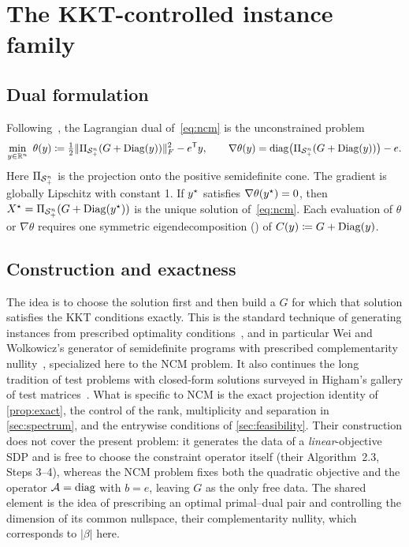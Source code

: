 \section{The KKT-controlled instance family}\label{sec:family}

\subsection{Dual formulation}
Following~\cite{malick2004dual,qisun2006quadratically}, the Lagrangian dual of~\eqref{eq:ncm}
is the unconstrained problem
\begin{equation}\label{eq:dual}
  \min_{y\in\mathbb{R}^n}\ \theta(y) \coloneqq \tfrac12\lVert \Pi_{\mathcal{S}_+^n}(G+\operatorname{Diag}(y))\rVert_F^2 - e^{\mathsf T}y ,
  \qquad
  \nabla\theta(y) = \operatorname{diag}\bigl(\Pi_{\mathcal{S}_+^n}(G+\operatorname{Diag}(y))\bigr) - e .
\end{equation}
Here $\Pi_{\mathcal{S}_+^n}$ is the projection onto the positive semidefinite cone. The
gradient is globally Lipschitz with constant 1. If $y^\star$ satisfies
$\nabla\theta(y^\star)=0$, then $X^\star=\Pi_{\mathcal{S}_+^n}(G+\operatorname{Diag}(y^\star))$ is the unique solution
of~\eqref{eq:ncm}. Each evaluation of $\theta$ or $\nabla\theta$ requires one
symmetric eigendecomposition (\EVD) of $C(y)\coloneqq G+\operatorname{Diag}(y)$.

\subsection{Construction and exactness}\label{sec:construction}
The idea is to choose the solution first and then build a $G$ for which that
solution satisfies the KKT conditions exactly. This is the standard technique
of generating instances from prescribed optimality
conditions~\cite{lenard1984randomly,calamai1993new}, and in particular Wei and
Wolkowicz's generator of semidefinite programs with prescribed complementarity
nullity~\cite{wei2010generating}, specialized here to the NCM problem. It also
continues the long tradition of test problems with closed-form solutions
surveyed in Higham's gallery of test matrices~\cite[Ch.~28]{higham2002accuracy}. What is
specific to NCM is the exact projection identity of \cref{prop:exact}, the
control of the rank, multiplicity and separation in \cref{sec:spectrum}, and
the entrywise conditions of \cref{sec:feasibility}.
Their construction does not cover the present problem: it generates the data
of a \emph{linear}-objective SDP and is free to choose the constraint operator
itself (their Algorithm~2.3, Steps 3--4), whereas the NCM problem fixes both
the quadratic objective and the operator $\mathcal{A}=\operatorname{diag}$ with $b=e$, leaving
$G$ as the only free data. The shared element is the idea of prescribing an
optimal primal--dual pair and controlling the dimension of its common
nullspace, their complementarity nullity, which corresponds to $|\beta|$ here.

